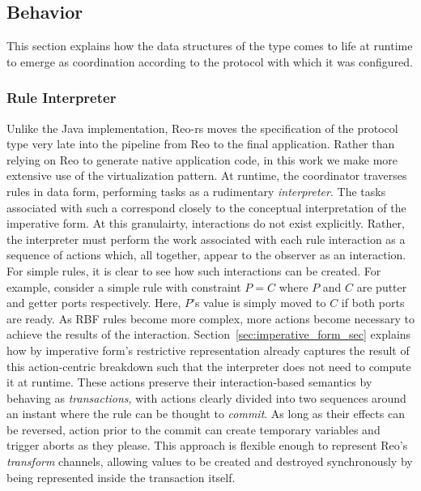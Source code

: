\subsection{Behavior}
\label{sec:behavior_implementation}
This section explains how the data structures of the  type comes to life at runtime to emerge as coordination according to the protocol with which it was configured. 

\subsubsection{Rule Interpreter}
Unlike the Java implementation, Reo-rs moves the specification of the protocol type very late into the pipeline from Reo to the final application. Rather than relying on Reo to generate native application code, in this work we make more extensive use of the virtualization pattern. At runtime, the coordinator traverses rules in data form, performing tasks as a rudimentary \textit{interpreter}. The tasks associated with such a  correspond closely to the conceptual interpretation of the imperative form. At this granulairty, interactions do not exist explicitly. Rather, the interpreter must perform the work associated with each rule interaction as a sequence of actions which, all together, appear to the observer as an interaction. For simple rules, it is clear to see how such interactions can be created. For example, consider a simple rule with constraint $P=C$ where $P$ and $C$ are putter and getter ports respectively. Here, $P$'s value is simply moved to $C$ if both ports are ready. As RBF rules become more complex, more actions become necessary to achieve the results of the interaction. Section~\ref{sec:imperative_form_sec} explains how by imperative form's restrictive representation already captures the result of this action-centric breakdown such that the interpreter does not need to compute it at runtime. These actions preserve their interaction-based semantics by behaving as \textit{transactions}, with actions clearly divided into two sequences around an instant where the rule can be thought to \textit{commit}. As long as their effects can be reversed, action prior to the commit can create temporary variables and trigger aborts as they please. This approach is flexible enough to represent Reo's \textit{transform} channels, allowing values to be created and destroyed synchronously by being represented inside the transaction itself. 


